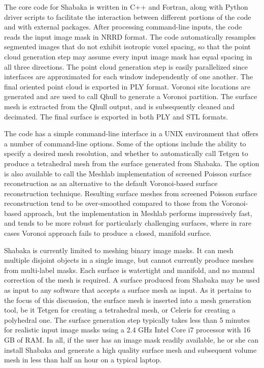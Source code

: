 The core code for Shabaka is written in C++ and Fortran, along with Python driver scripts to facilitate the interaction between different portions of the code and with external packages. After processing command-line inputs, the code reads the input image mask in NRRD format. The code automatically resamples segmented images that do not exhibit isotropic voxel spacing, so that the point cloud generation step may assume every input image mask has equal spacing in all three directions. The point cloud generation step is easily parallelized since interfaces are approximated for each window independently of one another. The final oriented point cloud is exported in PLY format. Voronoi site locations are generated and are used to call Qhull to generate a Voronoi partition. The surface mesh is extracted from the Qhull output, and is subsequently cleaned and decimated. The final surface is exported in both PLY and STL formats.

The code has a simple command-line interface in a UNIX environment that offers a number of command-line options. Some of the options include the ability to specify a desired mesh resolution, and whether to automatically call Tetgen to produce a tetrahedral mesh from the surface generated from Shabaka. The option is also available to call the Meshlab implementation of screened Poisson surface reconstruction as an alternative to the default Voronoi-based surface reconstruction technique. Resulting surface meshes from screened Poisson surface reconstruction tend to be over-smoothed compared to those from the Voronoi-based approach, but the implementation in Meshlab performs impressively fast, and tends to be more robust for particularly challenging surfaces, where in rare cases Voronoi approach fails to produce a closed, manifold surface.

Shabaka is currently limited to meshing binary image masks. It can mesh multiple disjoint objects in a single image, but cannot currently produce meshes from multi-label masks. Each surface is watertight and manifold, and no manual correction of the mesh is required. A surface produced from Shabaka may be used as input to any software that accepts a surface mesh as input. As it pertains to the focus of this discussion, the surface mesh is inserted into a mesh generation tool, be it Tetgen for creating a tetrahedral mesh, or Celeris for creating a polyhedral one. The surface generation step typically takes less than 5 minutes for realistic input image masks using a 2.4 GHz Intel Core i7 processor with 16 GB of RAM. In all, if the user has an image mask readily available, he or she can install Shabaka and generate a high quality surface mesh and subsequent volume mesh in less than half an hour on a typical laptop.

